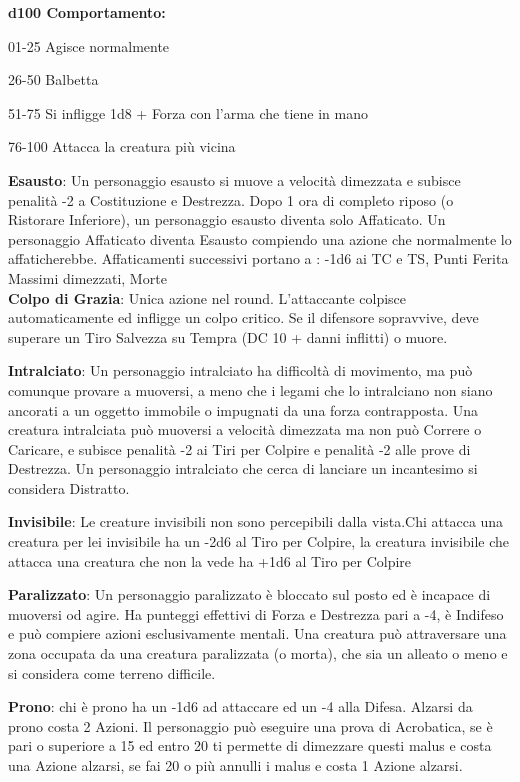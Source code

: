 \documentclass[a4paper,12 pt,openany]{book}
\begin{document}
\begin{textblock*}{19 cm}
\begin{multicols}{2}
\textbf{d100 Comportamento:}

01-25 Agisce normalmente

26-50 Balbetta

51-75 Si infligge 1d8 + Forza con l'arma che tiene in mano

76-100 Attacca la creatura più vicina

\textbf{Esausto}: Un personaggio esausto si muove a velocità dimezzata e subisce penalità -2 a Costituzione e Destrezza. Dopo 1 ora di completo riposo (o Ristorare Inferiore), un personaggio esausto diventa solo Affaticato. Un personaggio Affaticato diventa Esausto compiendo una azione che normalmente lo affaticherebbe.
Affaticamenti successivi portano a : -1d6 ai TC e TS, Punti Ferita Massimi dimezzati, Morte\\

\textbf{Colpo di Grazia}: Unica azione nel round. L'attaccante colpisce automaticamente ed infligge un colpo critico. Se il difensore sopravvive, deve superare un Tiro Salvezza su Tempra (DC 10 + danni inflitti) o muore.

\textbf{Intralciato}: Un personaggio intralciato ha difficoltà di movimento, ma può comunque provare a muoversi, a meno che i legami che lo intralciano non siano ancorati a un oggetto immobile o impugnati da una forza contrapposta.
Una creatura intralciata può muoversi a velocità dimezzata ma non può Correre o Caricare, e subisce penalità -2 ai Tiri per Colpire e penalità -2 alle prove di Destrezza.
Un personaggio intralciato che cerca di lanciare un incantesimo si considera Distratto.

\textbf{Invisibile}: Le creature invisibili non sono percepibili dalla vista.Chi attacca una creatura per lei invisibile ha un -2d6 al Tiro per Colpire, la creatura invisibile che attacca una creatura che non la vede ha +1d6 al Tiro per Colpire

\textbf{Paralizzato}: Un personaggio paralizzato è bloccato sul posto ed è incapace di muoversi od agire. Ha punteggi effettivi di Forza e Destrezza pari a -4, è Indifeso e può compiere azioni esclusivamente mentali.
Una creatura può attraversare una zona occupata da una creatura paralizzata (o morta), che sia un alleato o meno e si considera come terreno difficile.

\textbf{Prono}: chi è prono ha un -1d6 ad attaccare ed un -4 alla Difesa. Alzarsi da prono costa 2 Azioni.
Il personaggio può eseguire una prova di Acrobatica, se è pari o superiore a 15 ed entro 20 ti permette di dimezzare questi malus e costa una Azione alzarsi, se fai 20 o più annulli i malus e costa 1 Azione alzarsi.


\end{multicols}
\end{textblock*}
\end{document}
